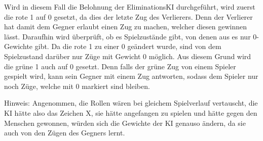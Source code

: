 \documentclass[titlepage]{scrartcl}
\begin{document}
Wird in diesem Fall die Belohnung der EliminationsKI durchgeführt, wird zuerst die rote 1 auf 0 gesetzt, da dies der letzte Zug des Verlierers. Denn der Verlierer hat damit dem Gegner erlaubt einen Zug zu machen, welcher diesen gewinnen lässt.
Daraufhin wird überprüft, ob es Spielzustände gibt, von denen aus es nur 0-Gewichte gibt. Da die rote 1 zu einer 0 geändert wurde, sind von dem Spielzustand darüber nur Züge mit Gewicht 0 möglich. Aus diesem Grund wird die grüne 1 auch auf 0 gesetzt. Denn falls der grüne Zug von einem Spieler gespielt wird, kann sein Gegner mit einem Zug antworten, sodass dem Spieler nur noch Züge, welche mit 0 markiert sind bleiben.

Hinweis: Angenommen, die Rollen wären bei gleichem Spielverlauf vertauscht, die KI hätte also das Zeichen X, sie hätte angefangen zu spielen und hätte gegen den Menschen gewonnen, würden sich die Gewichte der KI genauso ändern, da sie auch von den Zügen des Gegners lernt. 
\end{document}
